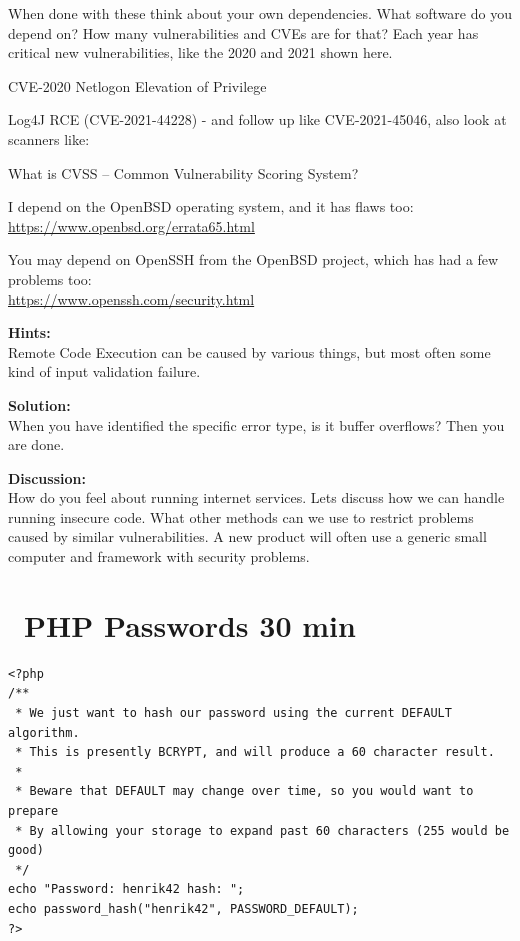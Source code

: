 \documentclass[a4paper,11pt,notitlepage]{report}
\begin{document}
When done with these think about your own dependencies. What software do you depend on? How many vulnerabilities and CVEs are for that? Each year has critical new vulnerabilities, like the 2020 and 2021 shown here.

\begin{list2}
\item CVE-2020 Netlogon Elevation of Privilege \\
\item Log4J RCE (CVE-2021-44228) - and follow up like CVE-2021-45046, also look at scanners like:\\
\end{list2}

What is CVSS -- Common Vulnerability Scoring System?

I depend on the OpenBSD operating system, and it has flaws too:\\
\url{https://www.openbsd.org/errata65.html}

You may depend on OpenSSH from the OpenBSD project, which has had a few problems too:\\
\url{https://www.openssh.com/security.html}

{\bf Hints:}\\
Remote Code Execution can be caused by various things, but most often some kind of input validation failure.

{\bf Solution:}\\
When you have identified the specific error type, is it buffer overflows? Then you are done.

{\bf Discussion:}\\
How do you feel about running internet services. Lets discuss how we can handle running insecure code.
What other methods can we use to restrict problems caused by similar vulnerabilities.
A new product will often use a generic small computer and framework with security problems.

\chapter{\faInfoCircle\ PHP Passwords 30 min}
\label{ex:php-passwords}

\begin{verbatim}
<?php
/**
 * We just want to hash our password using the current DEFAULT algorithm.
 * This is presently BCRYPT, and will produce a 60 character result.
 *
 * Beware that DEFAULT may change over time, so you would want to prepare
 * By allowing your storage to expand past 60 characters (255 would be good)
 */
echo "Password: henrik42 hash: ";
echo password_hash("henrik42", PASSWORD_DEFAULT);
?>
\end{verbatim}
\end{document}
